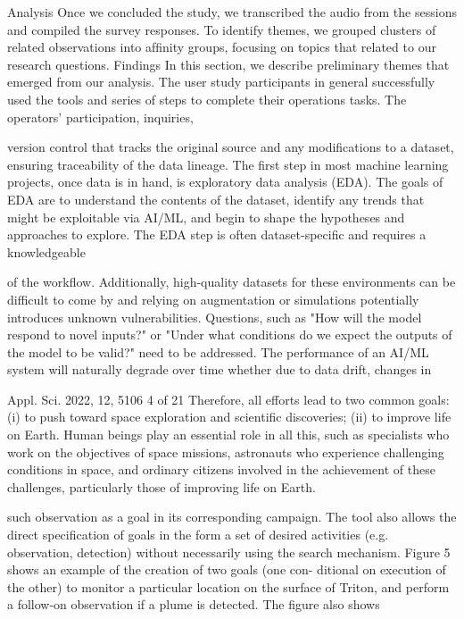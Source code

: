 \documentclass[a4paper,12pt]{article}
\begin{document}
Analysis
Once we concluded the study, we transcribed the audio from
the sessions and compiled the survey responses. To identify
themes, we grouped clusters of related observations into
afﬁnity groups, focusing on topics that related to our research
questions.
Findings
In this section, we describe preliminary themes that emerged
from our analysis.
The user study participants in general
successfully used the tools and series of steps to complete
their operations tasks. The operators’ participation, inquiries,

version control that tracks the original source and any modiﬁcations to a dataset, ensuring traceability of the data lineage.
The ﬁrst step in most machine learning projects, once data is in hand, is exploratory data analysis (EDA). The goals
of EDA are to understand the contents of the dataset, identify any trends that might be exploitable via AI/ML, and begin
to shape the hypotheses and approaches to explore. The EDA step is often dataset-speciﬁc and requires a knowledgeable

of the workﬂow. Additionally, high-quality datasets for these environments can be diﬃcult to come by and relying on
augmentation or simulations potentially introduces unknown vulnerabilities. Questions, such as "How will the model
respond to novel inputs?" or "Under what conditions do we expect the outputs of the model to be valid?" need to be
addressed. The performance of an AI/ML system will naturally degrade over time whether due to data drift, changes in

Appl. Sci. 2022, 12, 5106
4 of 21
Therefore, all efforts lead to two common goals: (i) to push toward space exploration
and scientiﬁc discoveries; (ii) to improve life on Earth. Human beings play an essential
role in all this, such as specialists who work on the objectives of space missions, astronauts
who experience challenging conditions in space, and ordinary citizens involved in the
achievement of these challenges, particularly those of improving life on Earth.

such observation as a goal in its corresponding campaign.
The tool also allows the direct speciﬁcation of goals in the
form a set of desired activities (e.g. observation, detection)
without necessarily using the search mechanism. Figure 5
shows an example of the creation of two goals (one con-
ditional on execution of the other) to monitor a particular
location on the surface of Triton, and perform a follow-on
observation if a plume is detected. The ﬁgure also shows
\end{document}
